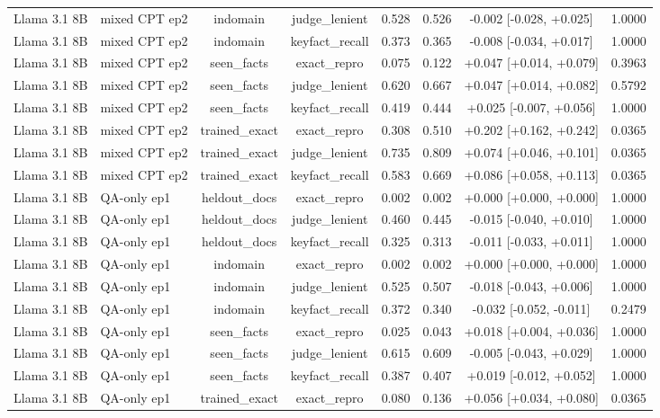 \begin{table}[t]
{\begin{tabular}{llcccccc}
Llama 3.1 8B & mixed CPT ep2 & indomain & judge\_lenient & 0.528 & 0.526 & -0.002 [-0.028, +0.025] & 1.0000 \\
Llama 3.1 8B & mixed CPT ep2 & indomain & keyfact\_recall & 0.373 & 0.365 & -0.008 [-0.034, +0.017] & 1.0000 \\
Llama 3.1 8B & mixed CPT ep2 & seen\_facts & exact\_repro & 0.075 & 0.122 & +0.047 [+0.014, +0.079] & 0.3963 \\
Llama 3.1 8B & mixed CPT ep2 & seen\_facts & judge\_lenient & 0.620 & 0.667 & +0.047 [+0.014, +0.082] & 0.5792 \\
Llama 3.1 8B & mixed CPT ep2 & seen\_facts & keyfact\_recall & 0.419 & 0.444 & +0.025 [-0.007, +0.056] & 1.0000 \\
Llama 3.1 8B & mixed CPT ep2 & trained\_exact & exact\_repro & 0.308 & 0.510 & +0.202 [+0.162, +0.242] & 0.0365 \\
Llama 3.1 8B & mixed CPT ep2 & trained\_exact & judge\_lenient & 0.735 & 0.809 & +0.074 [+0.046, +0.101] & 0.0365 \\
Llama 3.1 8B & mixed CPT ep2 & trained\_exact & keyfact\_recall & 0.583 & 0.669 & +0.086 [+0.058, +0.113] & 0.0365 \\
Llama 3.1 8B & QA-only ep1 & heldout\_docs & exact\_repro & 0.002 & 0.002 & +0.000 [+0.000, +0.000] & 1.0000 \\
Llama 3.1 8B & QA-only ep1 & heldout\_docs & judge\_lenient & 0.460 & 0.445 & -0.015 [-0.040, +0.010] & 1.0000 \\
Llama 3.1 8B & QA-only ep1 & heldout\_docs & keyfact\_recall & 0.325 & 0.313 & -0.011 [-0.033, +0.011] & 1.0000 \\
Llama 3.1 8B & QA-only ep1 & indomain & exact\_repro & 0.002 & 0.002 & +0.000 [+0.000, +0.000] & 1.0000 \\
Llama 3.1 8B & QA-only ep1 & indomain & judge\_lenient & 0.525 & 0.507 & -0.018 [-0.043, +0.006] & 1.0000 \\
Llama 3.1 8B & QA-only ep1 & indomain & keyfact\_recall & 0.372 & 0.340 & -0.032 [-0.052, -0.011] & 0.2479 \\
Llama 3.1 8B & QA-only ep1 & seen\_facts & exact\_repro & 0.025 & 0.043 & +0.018 [+0.004, +0.036] & 1.0000 \\
Llama 3.1 8B & QA-only ep1 & seen\_facts & judge\_lenient & 0.615 & 0.609 & -0.005 [-0.043, +0.029] & 1.0000 \\
Llama 3.1 8B & QA-only ep1 & seen\_facts & keyfact\_recall & 0.387 & 0.407 & +0.019 [-0.012, +0.052] & 1.0000 \\
Llama 3.1 8B & QA-only ep1 & trained\_exact & exact\_repro & 0.080 & 0.136 & +0.056 [+0.034, +0.080] & 0.0365 \\

\end{tabular}}
\end{table}

